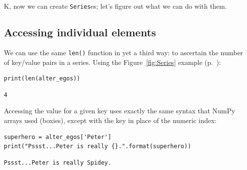 


\chapter[Associative arrays in Python (2 of 3)]{\huge\selectfont{Associative
arrays in Python (2 of 3)}}
\label{ch:assocArraysInPython2}

K, now we can create \texttt{Series}es; let's figure out what we can do with
them.

\section{Accessing individual elements}


We can use the same \texttt{len()} function in yet a third way: to ascertain
the number of key/value pairs in a series. Using the Figure~\ref{fig:Series}
example (p.~\pageref{fig:Series}):

\begin{Verbatim}[fontsize=\small,samepage=true,frame=single,framesep=3mm]
print(len(alter_egos))
\end{Verbatim}

\begin{Verbatim}[fontsize=\small,samepage=true,frame=leftline,framesep=5mm,framerule=1mm]
4
\end{Verbatim}


Accessing the value for a given key uses exactly the same syntax that NumPy
arrays used (boxies), except with the key in place of the numeric index:

\begin{Verbatim}[fontsize=\small,samepage=true,frame=single,framesep=3mm]
superhero = alter_egos['Peter']
print("Pssst...Peter is really {}.".format(superhero))
\end{Verbatim}

\begin{Verbatim}[fontsize=\small,samepage=true,frame=leftline,framesep=5mm,framerule=1mm]
Pssst...Peter is really Spidey.
\end{Verbatim}

